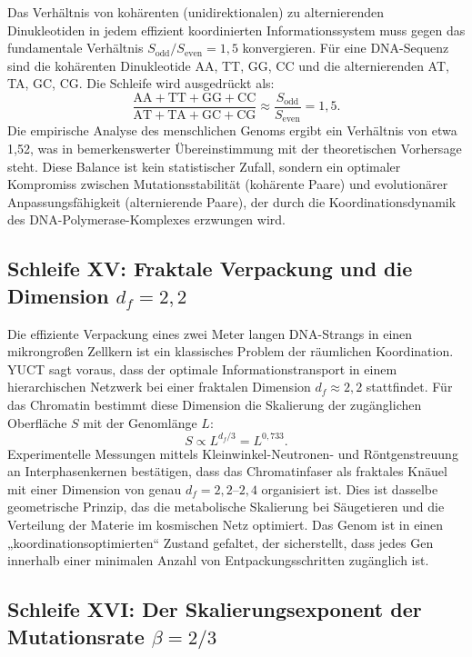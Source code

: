 \documentclass[12pt]{article}
\begin{document}
	Das Verhältnis von kohärenten (unidirektionalen) zu alternierenden Dinukleotiden in jedem effizient koordinierten Informationssystem muss gegen das fundamentale Verhältnis \(S_{\mathrm{odd}}/S_{\mathrm{even}} = 1,5\) konvergieren. Für eine DNA-Sequenz sind die kohärenten Dinukleotide AA, TT, GG, CC und die alternierenden AT, TA, GC, CG. Die Schleife wird ausgedrückt als:
	\begin{equation}
		\boxed{ \frac{\text{AA} + \text{TT} + \text{GG} + \text{CC}}{\text{AT} + \text{TA} + \text{GC} + \text{CG}} \approx \frac{S_{\mathrm{odd}}}{S_{\mathrm{even}}} = 1,5 }.
	\end{equation}
	Die empirische Analyse des menschlichen Genoms ergibt ein Verhältnis von etwa 1,52, was in bemerkenswerter Übereinstimmung mit der theoretischen Vorhersage steht. Diese Balance ist kein statistischer Zufall, sondern ein optimaler Kompromiss zwischen Mutationsstabilität (kohärente Paare) und evolutionärer Anpassungsfähigkeit (alternierende Paare), der durch die Koordinationsdynamik des DNA-Polymerase-Komplexes erzwungen wird.
	
	\subsection{Schleife XV: Fraktale Verpackung und die Dimension \(d_f = 2,2\)}
	
	Die effiziente Verpackung eines zwei Meter langen DNA-Strangs in einen mikrongroßen Zellkern ist ein klassisches Problem der räumlichen Koordination. YUCT sagt voraus, dass der optimale Informationstransport in einem hierarchischen Netzwerk bei einer fraktalen Dimension \(d_f \approx 2,2\) stattfindet. Für das Chromatin bestimmt diese Dimension die Skalierung der zugänglichen Oberfläche \(S\) mit der Genomlänge \(L\):
	\begin{equation}
		\boxed{ S \propto L^{d_f/3} = L^{0,733} }.
	\end{equation}
	Experimentelle Messungen mittels Kleinwinkel-Neutronen- und Röntgenstreuung an Interphasenkernen bestätigen, dass das Chromatinfaser als fraktales Knäuel mit einer Dimension von genau \(d_f = 2,2\)–\(2,4\) organisiert ist. Dies ist dasselbe geometrische Prinzip, das die metabolische Skalierung bei Säugetieren und die Verteilung der Materie im kosmischen Netz optimiert. Das Genom ist in einen „koordinationsoptimierten“ Zustand gefaltet, der sicherstellt, dass jedes Gen innerhalb einer minimalen Anzahl von Entpackungsschritten zugänglich ist.
	
	\subsection{Schleife XVI: Der Skalierungsexponent der Mutationsrate \(\beta = 2/3\)}
	
\end{document}
